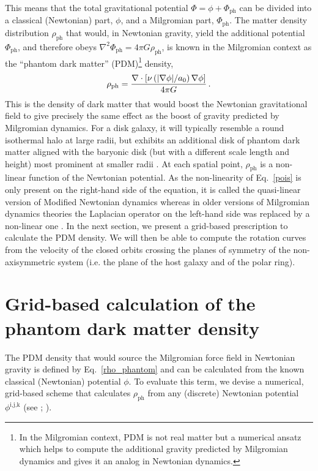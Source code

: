 \documentclass[useAMS,usenatbib]{mn2e}
\newcommand{\PhiN}{\phi}
\newcommand{\Phiph}{\Phi_\text{ph}}
\newcommand{\grad}{{\bf \nabla}}
\begin{document}
This means that the total gravitational potential $\Phi = \PhiN + \Phiph$ can be divided into a classical (Newtonian) part, $\PhiN$, and a Milgromian part, $\Phiph$.
The matter density distribution $\rho_\text{ph}$ that would, in Newtonian gravity, yield the additional potential $\Phiph$, and therefore obeys $\nabla^2 \Phiph = 4\pi G \rho_\text{ph}$, is known in the Milgromian context as the ``phantom dark matter'' (PDM)\footnote{In the Milgromian context, PDM is not real matter but a numerical ansatz which helps to compute the additional gravity predicted by Milgromian dynamics and gives it an analog in Newtonian dynamics.} density,
\begin{equation}
	\rho_\text{ph} = \frac{\nabla \cdot \left[ \nu\left(|{\mathbf\grad} \PhiN|/a_0\right) {\mathbf\grad} \PhiN \right]}{4\pi G} \,.
\label{rho_phantom}
\end{equation}
This is the density of dark matter that would boost the Newtonian gravitational field to give precisely the same effect as the boost of gravity predicted by Milgromian dynamics. For a disk galaxy, it will typically resemble a round isothermal halo at large radii, but exhibits an additional disk of phantom dark matter aligned with the baryonic disk (but with a different scale length and height) most prominent at smaller radii \citep{mondhalo}.
At each spatial point, $\rho_\text{ph}$ is a non-linear function of the Newtonian potential.
As the non-linearity of Eq.~\ref{pois} is only present on the right-hand side of the equation, it is called the quasi-linear version of Modified Newtonian dynamics \citep[][]{QUMOND} whereas in older versions of Milgromian dynamics theories the Laplacian operator on the left-hand side was replaced by a non-linear one \citep{BM84}. 
In the next section, we present a grid-based prescription to calculate the PDM density. We will then be able to compute the rotation curves from the velocity of the closed orbits crossing the planes of symmetry of the non-axisymmetric system (i.e. the plane of the host galaxy and of the polar ring). 

\section{Grid-based calculation of the phantom dark matter density}\label{sect:pdm_calculation}
The PDM density that would source the Milgromian force field in Newtonian gravity
 is defined by Eq.~\ref{rho_phantom} and can be calculated from the known classical (Newtonian) potential $\PhiN$.
To evaluate this term, we devise a numerical, grid-based scheme that calculates $\rho_\text{ph}$ from any (discrete) Newtonian potential $\PhiN^\text{i,j,k}$ 
(see \citealp[][Eq.~35]{FamMcgaugh}; \citealp{Angus1,Angus2}).
\end{document}
